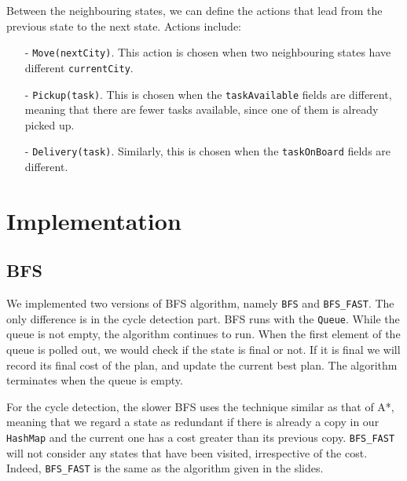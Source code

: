 \documentclass[10.5pt]{article}
\begin{document}
Between the neighbouring states, we can define the actions that lead from the previous state to the next state. Actions include:
\begin{enumerate}
	\item[-]\texttt{Move(nextCity)}. This action is chosen when two neighbouring states have different \texttt{currentCity}.
	\item[-]\texttt{Pickup(task)}. This is chosen when the \texttt{taskAvailable} fields are different, meaning that there are fewer tasks available, since one of them is already picked up. 
	\item[-]\texttt{Delivery(task)}. Similarly, this is chosen when the \texttt{taskOnBoard} fields are different.
	
\end{enumerate}

\section{Implementation}

\subsection{BFS}
We implemented two versions of BFS algorithm, namely \texttt{BFS} and \texttt{BFS\_FAST}. The only difference is in the cycle detection part. BFS runs with the \texttt{Queue}. While the queue is not empty, the algorithm continues to run. When the first element of the queue is polled out, we would check if the state is final or not. If it is final we will record its final cost of the plan, and update the current best plan. The algorithm terminates when the queue is empty.

For the cycle detection, the slower BFS uses the technique similar as that of A*, meaning that we regard a state as redundant if there is already a copy in our \texttt{HashMap} and the current one has a cost greater than its previous copy. \texttt{BFS\_FAST} will not consider any states that have been visited, irrespective of the cost. Indeed, \texttt{BFS\_FAST} is the same as the algorithm given in the slides.
\end{document}
